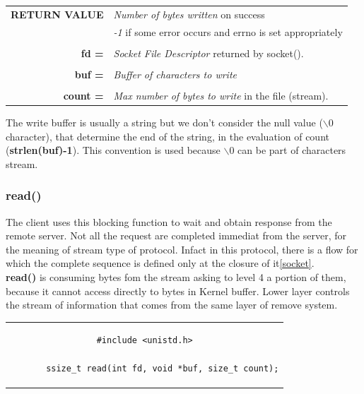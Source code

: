 \begin{table}[h]
\centering
\begin{tabular}{rcl}
\textbf{RETURN VALUE} & \multicolumn{2}{l}{\textit{Number of bytes written} on success}\\
{} & \multicolumn{2}{l}{\textit{-1} if some error occurs and errno is set appropriately}\\
& & \\
\textbf{fd =} & \multicolumn{2}{l}{\textit{Socket File Descriptor} returned by socket().}\\
& &\\
\textbf{buf =} & \multicolumn{2}{l}{\textit{Buffer of characters to write}}\\
& & \\
\textbf{count =} & \multicolumn{2}{l}{\textit{Max number of bytes to write} in the file (stream).}\\
\end{tabular}
\end{table}
The write buffer is usually a string but we don't consider the null value (\textbf{$\backslash 0$} character), that determine the end of the string, in the evaluation of count (\textbf{strlen(buf)-1}). This convention is used because \textbf{$\backslash 0$} can be part of characters stream.\\

\subsubsection{read()}
The client uses this blocking function to wait and obtain response from the remote server. Not all the request are completed immediat from the server, for the meaning of stream type of protocol. Infact in this protocol, there is a flow for which the complete sequence is defined only at the closure of it\ref{socket}.\\
\textbf{read()} is consuming bytes fom the stream asking to level 4 a portion of them, because it cannot access directly to bytes in Kernel buffer. Lower layer controls the stream of information that comes from the same layer of remove system.\\
\vspace{3cm}
\begin{center}
\begin{tabular}{c}
\begin{lstlisting}[linewidth=280pt, basicstyle=\footnotesize\sffamily,]
#include <unistd.h>

       ssize_t read(int fd, void *buf, size_t count);
\end{lstlisting}
\end{tabular}
\end{center}

